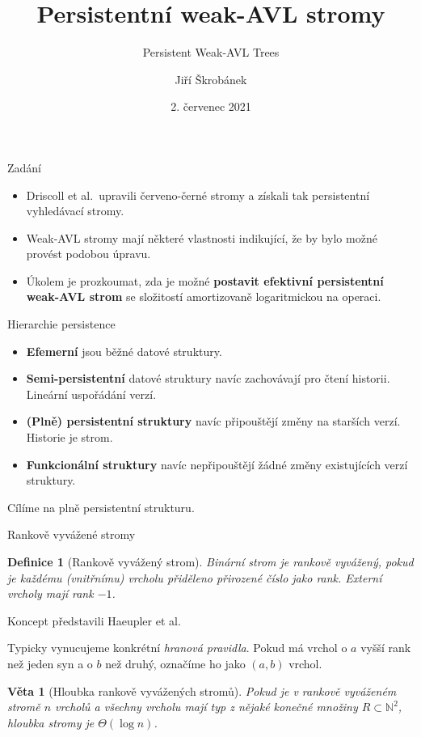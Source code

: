 \documentclass{beamer}
\title{Persistentní weak-AVL stromy}
\subtitle{Persistent Weak-AVL Trees}
\author
{Jiří Škrobánek}
\date{2. červenec 2021}
\theoremstyle{mytheoremstyle}
\newtheorem{dfn}{Definice}
\newtheorem{thm}{Věta}
\begin{document}
\begin{frame}
  \titlepage
\end{frame}

\begin{frame}{Zadání}
\begin{itemize}
\item
Driscoll et al.~upravili červeno-černé stromy a získali tak persistentní vyhledávací stromy.
\item
Weak-AVL stromy mají některé vlastnosti indikující, že by bylo možné provést podobou úpravu.
\item
Úkolem je prozkoumat, zda je možné {\bf postavit efektivní persistentní weak-AVL strom} se složitostí amortizovaně logaritmickou na operaci.
\end{itemize}
\end{frame}


\begin{frame}{Hierarchie persistence}
\begin{itemize}
  \item \textbf{Efemerní} jsou běžné datové struktury.
  \item \textbf{Semi-persistentní} datové struktury navíc zachovávají pro čtení historii. Lineární uspořádání verzí.
  \item \textbf{(Plně) persistentní struktury} navíc připouštějí změny na starších verzí. Historie je strom.
  \item \textbf{Funkcionální struktury} navíc nepřipouštějí žádné změny existujících verzí struktury. 
\end{itemize}
Cílíme na plně persistentní strukturu.
\end{frame}



\begin{frame}{Rankově vyvážené stromy}
\begin{dfn}[Rankově vyvážený strom]
Binární strom je rankově vyvážený, pokud je každému (vnitřnímu) vrcholu přiděleno přirozené číslo jako \emph{rank}. Externí vrcholy mají rank $-1$.
\end{dfn}
Koncept představili Haeupler et al.

\pause

Typicky vynucujeme konkrétní \emph{hranová pravidla}. Pokud má vrchol o $a$ vyšší rank než jeden syn a o $b$ než druhý, označíme ho jako $(a,b)$ vrchol.

\pause

\begin{thm}[Hloubka rankově vyvážených stromů]
Pokud je v rankově vyváženém stromě $n$ vrcholů a všechny vrcholu mají typ z nějaké konečné množiny $R \subset \mathbb{N}^2$, hloubka stromy je $\Theta(\log n)$.
\end{thm}
\end{frame}
\end{document}
